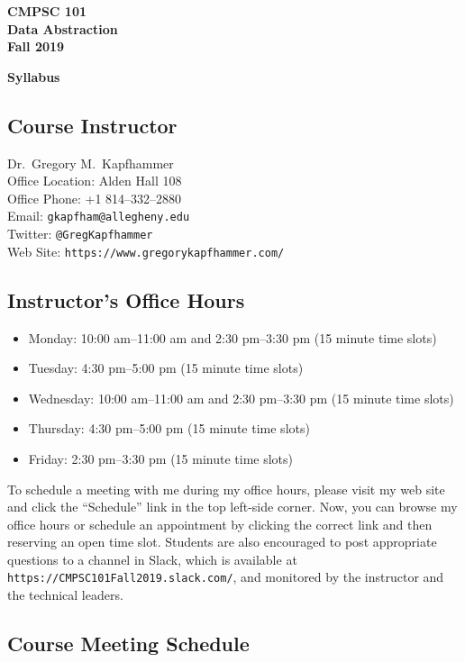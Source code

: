 \documentclass[11pt]{article}
\newcommand{\url}[1]{\lstinline{#1}}
\newcommand{\syllabustitle}[1]
{
  \begin{center}
    \begin{center}
      \bf
      CMPSC 101\\Data Abstraction\\
      Fall 2019\\
      \medskip
    \end{center}
    \bf
    #1
  \end{center}
}
\begin{document}
\thispagestyle{empty}

\syllabustitle{Syllabus}

\subsection*{Course Instructor}
Dr.\ Gregory M.\ Kapfhammer\\
\noindent Office Location: Alden Hall 108 \\
\noindent Office Phone: +1 814--332--2880 \\
\noindent Email: \url{gkapfham@allegheny.edu} \\
\noindent Twitter: \url{@GregKapfhammer} \\
\noindent Web Site: \url{https://www.gregorykapfhammer.com/}

\subsection*{Instructor's Office Hours}

\begin{itemize}
  \itemsep.25em

  \item Monday: 10:00 am--11:00 am and 2:30 pm--3:30 pm (15 minute time slots)

  \item Tuesday: 4:30 pm--5:00 pm (15 minute time slots)

  \item Wednesday: 10:00 am--11:00 am and 2:30 pm--3:30 pm (15 minute time slots)

  \item Thursday: 4:30 pm--5:00 pm (15 minute time slots)

  \item Friday: 2:30 pm--3:30 pm (15 minute time slots)

\end{itemize}

\noindent To schedule a meeting with me during my office hours, please visit my
web site and click the ``Schedule'' link in the top left-side corner. Now, you
can browse my office hours or schedule an appointment by clicking the correct
link and then reserving an open time slot. Students are also encouraged to post
appropriate questions to a channel in Slack, which is available at
\url{https://CMPSC101Fall2019.slack.com/}, and monitored by the instructor and
the technical leaders.

\subsection*{Course Meeting Schedule}
\end{document}
